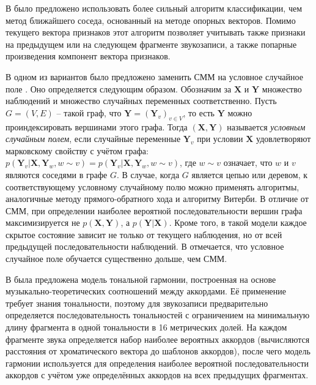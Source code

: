 В \cite{Weller2009} было предложено использовать более сильный алгоритм
классификации, чем метод ближайшего соседа, основанный на методе опорных
векторов. Помимо текущего вектора признаков этот алгоритм позволяет учитывать
также признаки на предыдущем или на следующем фрагменте звукозаписи, а также
попарные произведения компонент вектора признаков.

В одном из вариантов \cite{Burgoyne2007} было предложено заменить СММ на
условное случайное поле \cite{Lafferty2001}. Оно определяется следующим образом.
Обозначим за $\boldsymbol{X}$ и $\boldsymbol{Y}$ множество наблюдений и
множество случайных переменных соответственно. Пусть $G = (V, E)$ -- такой граф,
что $\boldsymbol{Y} = (\boldsymbol{Y}_v)_{v \in V}$, то есть $\boldsymbol{Y}$
можно проиндексировать вершинами этого графа. Тогда $(\boldsymbol{X},
\boldsymbol{Y})$ называется \emph{условным случайным полем}, если случайные
переменные $\boldsymbol{Y}_v$ при условии $\boldsymbol{X}$ удовлетворяют
марковскому свойству с учётом графа: $p(\boldsymbol{Y}_v | \boldsymbol{X},
\boldsymbol{Y}_w, w \sim v) = p(\boldsymbol{Y}_v | \boldsymbol{X},
\boldsymbol{Y}_w, w \sim v)$, где $w \sim v$ означает, что $w$ и $v$ являются
соседями в графе $G$. В случае, когда $G$ является цепью или деревом, к
соответствующему условному случайному полю можно применять алгоритмы,
аналогичные методу прямого-обратного хода и алгоритму Витерби. В отличие от СММ,
при определении наиболее вероятной последовательности вершин графа
максимизируется не $p(\boldsymbol{X}, \boldsymbol{Y})$, а $p(\boldsymbol{Y} |
\boldsymbol{X})$. Кроме того, в такой модели каждое скрытое состояние зависит не
только от текущего наблюдения, но от всей предыдущей последовательности
наблюдений. В \cite{Burgoyne2007} отмечается, что условное случайное поле
обучается существенно дольше, чем СММ.

В \cite{DeHaas2012} была предложена модель тональной гармонии, построенная на
основе музыкально-теоретических соотношений между аккордами. Её применение
требует знания тональности, поэтому для звукозаписи предварительно определяется
последовательность тональностей с ограничением на минимальную длину фрагмента в
одной тональности в 16 метрических долей. На каждом фрагменте звука определяется
набор наиболее вероятных аккордов (вычисляются расстояния от хроматического
вектора до шаблонов аккордов), после чего модель гармонии используется для
определения наиболее вероятной последовательности аккордов с учётом уже
определённых аккордов на всех предыдущих фрагментах.

